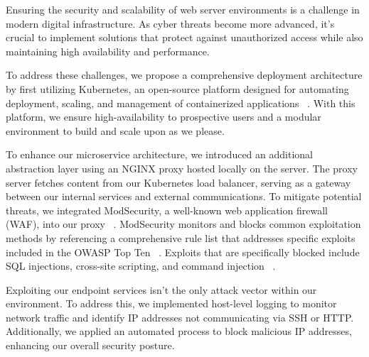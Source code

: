 Ensuring the security and scalability of web server environments is a challenge in modern digital infrastructure. 
As cyber threats become more advanced, it's crucial to implement solutions that protect against unauthorized access 
while also maintaining high availability and performance. 

To address these challenges, we propose a comprehensive deployment architecture by first utilizing Kubernetes, an open-source platform designed for automating deployment, scaling, 
and management of containerized applications ~\cite{kubernetes}. With this platform, we ensure high-availability to prospective users and a modular environment to build and scale upon as we please. 

To enhance our microservice architecture, we introduced an additional abstraction layer using an NGINX proxy hosted locally on the server. 
The proxy server fetches content from our Kubernetes load balancer, serving as a gateway between our internal services and external communications. 
To mitigate potential threats, we integrated ModSecurity, a well-known web application firewall (WAF), into our proxy ~\cite{modsecurity}. 
ModSecurity monitors and blocks common exploitation methods by referencing a comprehensive rule list that addresses specific exploits included in the OWASP Top Ten ~\cite{owasp_top_ten}. Exploits that are specifically blocked include SQL injections, cross-site scripting, and command injection ~\cite{modsec_owasp}.

Exploiting our endpoint services isn't the only attack vector within our environment. 
To address this, we implemented host-level logging to monitor network traffic and identify IP addresses not communicating via SSH or HTTP. 
Additionally, we applied an automated process to block malicious IP addresses, enhancing our overall security posture.

